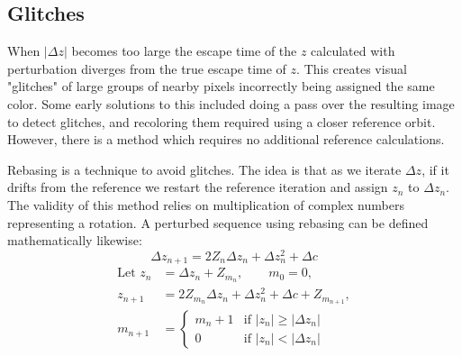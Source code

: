 \documentclass{article}
\begin{document}
\subsection{Glitches}
When $|\Delta z|$ becomes too large the escape time of the $z$ calculated with perturbation diverges from the true escape time of $z$. This creates visual "glitches" of large groups of nearby pixels incorrectly being assigned the same color. Some early solutions to this included doing a pass over the resulting image to detect glitches, and recoloring them required using a closer reference orbit. However, there is a method which requires no additional reference calculations.
\par Rebasing is a technique to avoid glitches. The idea is that as we iterate $\Delta z$, if it drifts from the reference we restart the reference iteration and assign $z_n$ to $\Delta z_n$. The validity of this method relies on multiplication of complex numbers representing a rotation\cite{Zhouran_}. A perturbed sequence using rebasing can be defined mathematically likewise: 
\[\Delta z_{n+1} = 2Z_n\Delta z_n+\Delta z_n^2 + \Delta c\]
\[
\begin{aligned}
    \text{Let } z_n &= \Delta z_n+Z_{m_n}, \qquad m_0=0, \\
    z_{n+1} &= 2Z_{m_n}\Delta z_n+\Delta z_n^2 + \Delta c + Z_{m_{n+1}}, \\
    m_{n+1} &= \begin{cases}
        m_n+1 & \text{if } |z_n| \geq |\Delta z_n|\\
        0 & \text{if } |z_n| < |\Delta z_n|
    \end{cases}
\end{aligned}
\]
\end{document}
